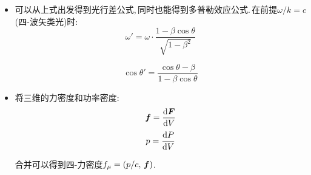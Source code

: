 \begin{itemize}
\item 可以从上式出发得到光行差公式,\,同时也能得到多普勒效应公式.\,在前提$\omega/k=c$(四-波矢类光)时:
\[\omega'=\omega\cdot \frac{1-\beta \cos\theta}{\sqrt{1-\beta^2}}\]

\[\cos \theta'=\frac{\cos \theta -\beta}{1-\beta \cos\theta}\]

\item 将三维的力密度和功率密度:
\[\boldsymbol{f}=\frac{\textrm{d} \boldsymbol{F}}{\textrm{d} V}\]
\[p=\frac{\textrm{d} P}{\textrm{d} V}\]

合并可以得到四-力密度$f_\mu=(p/c,\,\boldsymbol{f})$.

\end{itemize}

